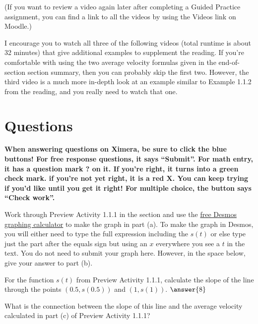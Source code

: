 \documentclass{ximera}
\begin{document}
(If you want to review a video again later after completing a Guided
Practice assignment, you can find a link to all the videos by using
the Videos link on Moodle.)

I encourage you to watch all three of the following videos (total
runtime is about 32 minutes) that give additional examples to
supplement the reading. If you're comfortable with using the two
average velocity formulas given in the end-of-section section summary, then
you can probably skip the first two. However, the third video is a
much more in-depth look at an example similar to Example 1.1.2 from the
reading, and you really need to watch that one.


\section*{Questions}

\textbf{When answering questions on Ximera, be sure to click the blue buttons!
For free response questions, it says ``Submit''. For math entry, it
has a question mark ? on it. If you're right, it turns into a green
check mark. if you're not yet right, it is a red X. You can keep
trying if you'd like until you get it right! For multiple choice, the
button says ``Check work''.}

\begin{exercise}
  Work through Preview Activity 1.1.1 in the section and use the
  \href{http://www.desmos.com}{free Desmos graphing calculator} to
  make the graph in part (a). To make the graph in Desmos, you will
  either need to type the full expression including the $s(t)$ or
  else type just the part after the equals sign but using an $x$
  everywhere you see a $t$ in the text. You do not need to submit your
  graph here. However, in the space below, give your answer to part
  (b).

  \begin{freeResponse}
  
  \end{freeResponse}
\end{exercise}
\begin{exercise}
  For the function $s(t)$ from Preview Activity 1.1.1, calculate the
  slope of the line through the points $(0.5,s(0.5))$ and
  $(1,s(1))$. $\answer{8}$
\end{exercise}

\begin{exercise}  
What is the connection between the slope of this line and the average velocity calculated in part (c) of Preview Activity 1.1.1?
  \begin{multipleChoice}  
  \end{multipleChoice}  
\end{exercise}
\end{document}

